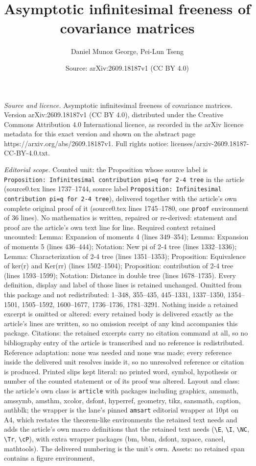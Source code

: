 \documentclass[10pt,a4paper]{amsart}
\title[Asymptotic infinitesimal freeness of covariance matrices]{Asymptotic infinitesimal freeness of covariance matrices}
\author{Daniel Munoz George, Pei-Lun Tseng}
\date{Source: arXiv:2609.18187v1 (CC BY 4.0)}
\begin{document}
\maketitle

\noindent\emph{Source and licence.} Asymptotic infinitesimal freeness of covariance matrices. Version arXiv:2609.18187v1 (CC BY 4.0), distributed under the Creative Commons Attribution 4.0 International licence, as recorded in the arXiv licence metadata for this exact version and shown on the abstract page https://arxiv.org/abs/2609.18187v1. Full rights notice: licenses/arxiv-2609.18187-CC-BY-4.0.txt.\par\smallskip

\noindent\textit{Editorial scope.} Counted unit: the Proposition whose source label is \texttt{Proposition: Infinitesimal contribution pi=q for 2-4 tree} in the article (source0.tex lines 1737--1744, source label \texttt{Proposition: Infinitesimal contribution pi=q for 2-4 tree}), delivered together with the article's own complete original proof of it (source0.tex lines 1745--1780, one \texttt{proof} environment of 36 lines). No mathematics is written, repaired or re-derived: statement and proof are the article's own text line for line. Required context retained uncounted: Lemma: Expansion of moments 4 (lines 349--354); Lemma: Expansion of moments 5 (lines 436--444); Notation: New pi of 2-4 tree (lines 1332--1336); Lemma: Characterization of 2-4 tree (lines 1351--1353); Proposition: Equivalence of ker(r) and Ker(rr) (lines 1502--1504); Proposition: contribution of 2-4 tree (lines 1593--1599); Notation: Distance in double tree (lines 1678--1735). Every definition, display and label of those lines is retained unchanged. Omitted from this package and not redistributed: 1--348, 355--435, 445--1331, 1337--1350, 1354--1501, 1505--1592, 1600--1677, 1736--1736, 1781--3291. Nothing inside a retained excerpt is omitted or altered: every retained body is delivered exactly as the article's lines are written, so no omission receipt of any kind accompanies this package. Citations: the retained excerpts carry no citation command at all, so no bibliography entry of the article is transcribed and no reference is redistributed. Reference adaptation: none was needed and none was made; every reference inside the delivered unit resolves inside it, so no unresolved reference or citation is produced. Printed slips kept literal: no printed word, symbol, hypothesis or number of the counted statement or of its proof was altered. Layout and class: the article's own class is \texttt{article} with packages including graphicx, amsmath, amssymb, amsthm, xcolor, dsfont, hyperref, geometry, tikz, sansmath, caption, authblk; the wrapper is the lane's pinned \texttt{amsart} editorial wrapper at 10pt on A4, which restates the theorem-like environments the retained text needs and adds the article's own macro definitions that the retained text needs (\texttt{\textbackslash E}, \texttt{\textbackslash I}, \texttt{\textbackslash NC}, \texttt{\textbackslash Tr}, \texttt{\textbackslash cP}), with extra wrapper packages (bm, bbm, dsfont, xspace, cancel, mathtools). The delivered numbering is the unit's own. Assets: no retained span contains a figure environment, 
\end{document}

